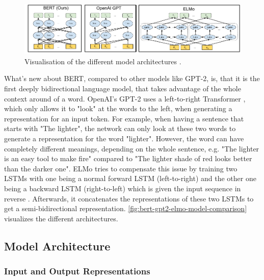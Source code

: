 \begin{figure}[h]
\centering
\includegraphics{figures/bert-gpt2-elmo-model-comparison}
\caption[Visualisation of the different model architectures]{Visualisation of the different model architectures \cite[p.~13]{devlin2018bert}.}
\label{fig:bert-gpt2-elmo-model-comparison}
\end{figure}

What's new about BERT, compared to other models like GPT-2, is, that it is the first deeply bidirectional language model, that takes advantage of the whole context around of a word.
OpenAI's GPT-2 uses a left-to-right Transformer \cite[p.~4]{radford2019language}, which only allows it to "look" at the words to the left, when generating a representation for an input token.
For example, when having a sentence that starts with "The lighter", the network can only look at these two words to generate a representation for the word "lighter".
However, the word can have completely different meanings, depending on the whole sentence, e.g. "The lighter is an easy tool to make fire" compared to "The lighter shade of red looks better than the darker one". 
ELMo tries to compensate this issue by training two LSTMs with one being a normal forward LSTM (left-to-right) and the other one being a backward LSTM (right-to-left) which is given the input sequence in reverse \cite[p.~2--3]{1802.05365}.
Afterwards, it concatenates the representations of these two LSTMs to get a semi-bidirectional representation.
\autoref{fig:bert-gpt2-elmo-model-comparison} visualizes the different architectures.

\subsection{Model Architecture}

\subsubsection{Input and Output Representations}

